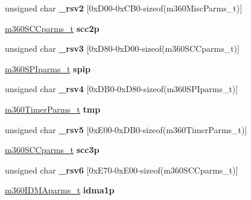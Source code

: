\begin{DoxyCompactItemize}
unsigned char {\bfseries \+\_\+rsv2} \mbox{[}0x\+D00-\/0x\+C\+B0-\/sizeof(m360\+Misc\+Parms\+\_\+t)\mbox{]}
\item 
\mbox{\label{structm360___a1f53361c2021be063418c31c75fbdd6d}} 
\mbox{\hyperlink{structm360SCCparms__}{m360\+S\+C\+Cparms\+\_\+t}} {\bfseries scc2p}
\item 
\mbox{\label{structm360___a64f93dcb8b96e52dd04cf8725381c42e}} 
unsigned char {\bfseries \+\_\+rsv3} \mbox{[}0x\+D80-\/0x\+D00-\/sizeof(m360\+S\+C\+Cparms\+\_\+t)\mbox{]}
\item 
\mbox{\label{structm360___a3f5794b37bf4c499b55959783d0d51cf}} 
\mbox{\hyperlink{structm360SPIparms__}{m360\+S\+P\+Iparms\+\_\+t}} {\bfseries spip}
\item 
\mbox{\label{structm360___ab70a8b772b4dfead2e651c1ac845379e}} 
unsigned char {\bfseries \+\_\+rsv4} \mbox{[}0x\+D\+B0-\/0x\+D80-\/sizeof(m360\+S\+P\+Iparms\+\_\+t)\mbox{]}
\item 
\mbox{\label{structm360___ab6bb440f9d02f5944939346b90f4a94c}} 
\mbox{\hyperlink{structm360TimerParms__}{m360\+Timer\+Parms\+\_\+t}} {\bfseries tmp}
\item 
\mbox{\label{structm360___a3d1a102a97928c4f40a350ed47c97dea}} 
unsigned char {\bfseries \+\_\+rsv5} \mbox{[}0x\+E00-\/0x\+D\+B0-\/sizeof(m360\+Timer\+Parms\+\_\+t)\mbox{]}
\item 
\mbox{\label{structm360___ae11f184ffe266369e078982e5e4161ca}} 
\mbox{\hyperlink{structm360SCCparms__}{m360\+S\+C\+Cparms\+\_\+t}} {\bfseries scc3p}
\item 
\mbox{\label{structm360___ad3170259488faff42d31d5f1b431c968}} 
unsigned char {\bfseries \+\_\+rsv6} \mbox{[}0x\+E70-\/0x\+E00-\/sizeof(m360\+S\+C\+Cparms\+\_\+t)\mbox{]}
\item 
\mbox{\label{structm360___a6ed53597a4910110310563847ec4c6b7}} 
\mbox{\hyperlink{structm360IDMAparms__}{m360\+I\+D\+M\+Aparms\+\_\+t}} {\bfseries idma1p}
\item 
\mbox{\label{structm360___a0785baf60a0078a62a6bbfff0219a18b}} 

\end{DoxyCompactItemize}
